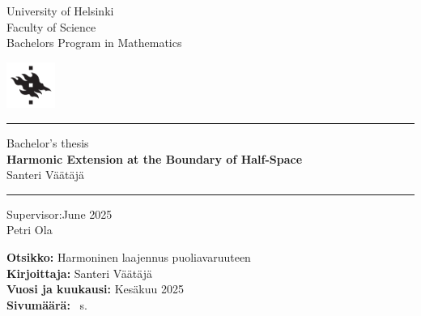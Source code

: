 \documentclass[a4paper, 11pt]{report}
\theoremstyle{plain}
\theoremstyle{definition}
\theoremstyle{remark}
\begin{document}
%
%
\begin{titlepage}

\noindent
\begin{minipage}[b]{\textwidth-45pt}
University of Helsinki\\
Faculty of Science\\
Bachelors Program in Mathematics
\end{minipage}
\hfill\includegraphics[width=45pt]{HYlogo.pdf}

\vspace{4pt}\hrule\vfill

\begin{center}
Bachelor's thesis\\[8pt]

{\huge\bfseries Harmonic Extension at the Boundary of Half-Space}\\[8pt]

Santeri Väätäjä
\end{center}

\vfill\hrule\vspace{4pt}

\noindent
Supervisor:\hfill June 2025\\
Petri Ola\\
\end{titlepage}

%
%
\cleardoublepage

\noindent\textbf{Otsikko:} Harmoninen laajennus puoliavaruuteen\\ %
\textbf{Kirjoittaja:} Santeri Väätäjä\\ %
\textbf{Vuosi ja kuukausi:} Kesäkuu 2025\\ %
\textbf{Sivumäärä:} \pageref*{LastPage}~s.\\[1em] %
\end{document}
